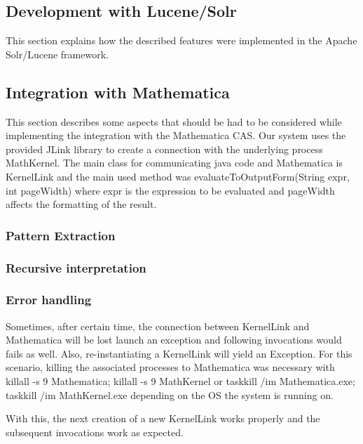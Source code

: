 \subsection{Development with Lucene/Solr}
This section explains how the described features were implemented in the {\codefont Apache Solr/Lucene} framework.
\subsection{Integration with Mathematica}
This section describes some aspects that should be had to be considered while implementing the integration with the Mathematica CAS. Our system uses the provided {\codefont JLink} library to create a connection with the underlying process {\codefont MathKernel}. The main class for communicating java code and {\codefont Mathematica} is {\codefont KernelLink} and the main used method was {\codefont evaluateToOutputForm(String expr, int pageWidth)} where {\codefont expr} is the expression to be evaluated and {\codefont pageWidth} affects the formatting of the result.

\subsubsection{Pattern Extraction}

\subsubsection{Recursive interpretation}

\subsubsection{Error handling}
Sometimes, after certain time, the connection between {\codefont KernelLink} and {\codefont Mathematica} will be lost launch an exception and following invocations would fails as well.
Also, re-instantiating a KernelLink will yield an Exception. For this scenario, killing the associated processes to Mathematica was necessary with {\codefont killall -s 9 Mathematica; killall -s 9 MathKernel
} or {\codefont taskkill /im Mathematica.exe; taskkill /im MathKernel.exe} depending on the OS the system is running on.

With this, the next creation of a new KernelLink works properly and the subsequent invocations work as expected.

